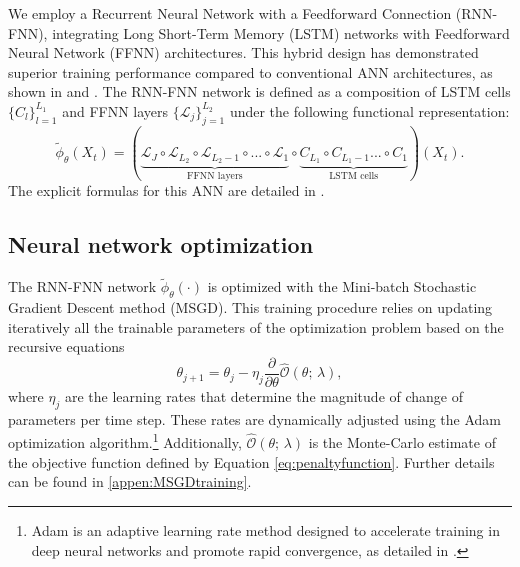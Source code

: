 \documentclass[12pt]{article}
\newcommand{\bc}[1]{{\color{blue}{#1}}}
\begin{document}
We employ a Recurrent Neural Network with a Feedforward Connection (RNN-FNN), integrating Long Short-Term Memory (LSTM) networks with Feedforward Neural Network (FFNN) architectures. This hybrid design has demonstrated superior training performance compared to conventional ANN architectures, as shown in \cite{fecamp2020deep} and \cite{François2025}. The RNN-FNN network is defined as a composition of LSTM cells $\{ C_{l} \}_{l=1}^{L_{1}}$ and FFNN layers $\{ \mathcal{L}_{j} \}_{j=1}^{L_{2}}$ under the following functional representation:
\begin{equation*}
    \tilde{\phi}_{\theta}(X_{t})=(\underbrace{ \mathcal{L}_{J} \circ \mathcal{L}_{L_{2}}\circ \mathcal{L}_{L_{2}-1}\circ ... \circ \mathcal{L}_{1}}_{\mbox{FFNN layers}}\circ \underbrace{C_{L_{1}}\circ C_{L_{1}-1}...\circ C_{1}}_{\mbox{LSTM cells}})(X_{t}).
\end{equation*}
The explicit formulas for this ANN are detailed in \cite{François2025}.


\subsection{Neural network optimization}\label{subse:neural optimization}
 
The RNN-FNN network $\tilde{\phi}_{\theta}(\cdot)$ is optimized with the Mini-batch Stochastic Gradient Descent method (MSGD). This training procedure relies on updating iteratively all the trainable parameters of the optimization problem based on the recursive equations
\begin{equation}\label{updatingrule_1}
    \theta_{j+1} = \theta_{j}-\eta_{j}\frac{\partial}{\partial \theta}\hat{\mathcal{O}}(\theta;\, \lambda),
\end{equation}
where $\eta_{j}$ are the learning rates that determine the magnitude of change of parameters per time step. %
These rates are dynamically adjusted using the Adam optimization algorithm.\footnote{
    Adam is an adaptive learning rate method designed to accelerate training in deep neural networks and promote rapid convergence, as detailed in \cite{KingmaB14}.} 
Additionally, $\hat{\mathcal{O}}(\theta;\, \lambda)$ is the Monte-Carlo estimate of the objective function defined by Equation \eqref{eq:penaltyfunction}. Further details can be found in \cref{appen:MSGDtraining}.
\end{document}
